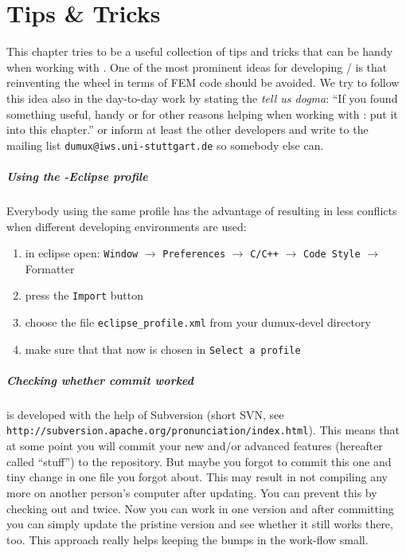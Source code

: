 \chapter{Tips \& Tricks}

This chapter tries to be a useful collection of tips and tricks that can be handy when working with 
\Dumux. One of the most prominent ideas for developing \Dune / \Dumux is that reinventing the wheel in terms of FEM code should
be avoided.  We try to follow this idea also in the day-to-day work by stating the \emph{tell us dogma}: ``If you found something useful, 
handy or for other reasons helping when working with \Dumux: put it into this chapter.'' or inform at least the other developers and write 
to the mailing list \texttt{dumux@iws.uni-stuttgart.de} so somebody else can.

\paragraph{Using the \Dumux-Eclipse profile}

Everybody using the same profile has the advantage of resulting in less conflicts when different developing environments are used:
\begin{enumerate}
  \item in eclipse open: \texttt{Window} $\rightarrow$ \texttt{Preferences} $\rightarrow$ \texttt{C/C++}  $\rightarrow$ \texttt{Code Style} $\rightarrow$ Formatter
  \item press the \texttt{Import} button
  \item choose the file \texttt{eclipse\_profile.xml} from your dumux-devel directory
  \item make sure that that now \Dumux is chosen in \texttt{Select a profile}
\end{enumerate}

\paragraph{Checking whether commit worked}

\Dumux is developed with the help of Subversion (short SVN, see \texttt{http://subversion.apache.org/pronunciation/index.html}). This means that at some point you will commit your new 
and/or advanced features (hereafter called ``stuff'') to the repository. But maybe you forgot to commit this one and tiny change in one file you forgot about. 
This may result in \Dumux not compiling any more on another person's computer after updating. You can prevent this by checking out \Dune and \Dumux twice. Now you can work in one version and after committing you can simply update the pristine version and see whether it still works there, too. 
This approach really helps keeping the bumps in the work-flow small.


